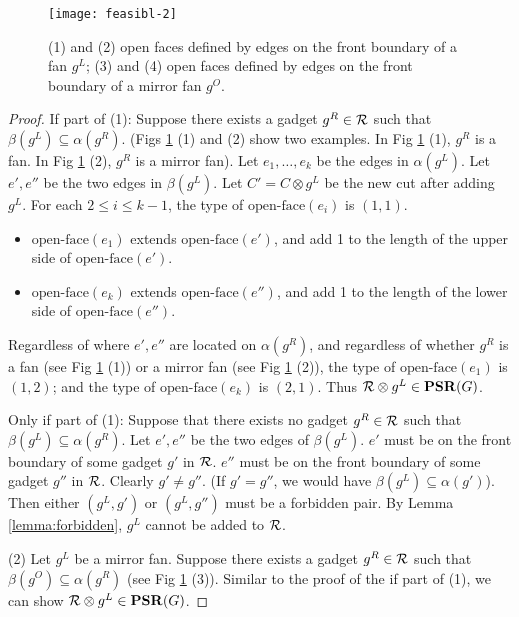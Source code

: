 \documentclass[11pt]{article}
\newcommand{\R}{{\cal R}}
\newcommand{\PSR}{\mathbf{PSR}}
\begin{document}
\begin{figure}[ht]
\begin{center}
\texttt{[image: feasibl-2]}
\centering
\caption{(1) and (2) open faces defined by edges on the front boundary of a fan $g^L$;
(3) and (4) open faces defined by edges on the front boundary of a mirror fan $g^O$.}
\label{fig:feasible}
\end{center}
\end{figure}
\vspace{-0.2in}

\begin{proof} If part of (1): Suppose there exists a gadget $g^R\in \R$
such that $\beta(g^L)\subseteq \alpha(g^R)$.
(Figs \ref{fig:feasible} (1) and (2) show two examples. In Fig
\ref{fig:feasible} (1), $g^R$ is a fan. In Fig \ref{fig:feasible} (2),
$g^R$ is a mirror fan). Let $e_1,\ldots,e_k$ be the edges in $\alpha(g^L)$.
Let $e',e''$ be the two edges in $\beta(g^L)$. Let $C'=C\otimes g^L$ be
the new cut after adding $g^L$. For each $2\leq i \leq k-1$, the type
of $\mbox{open-face}(e_i)$ is $(1,1)$.

\begin{itemize}
\item $\mbox{open-face}(e_1)$ extends $\mbox{open-face}(e')$, and
add 1 to the length of the upper side of $\mbox{open-face}(e')$.
\item $\mbox{open-face}(e_k)$ extends $\mbox{open-face}(e'')$, and
add 1 to the length of the lower side of $\mbox{open-face}(e'')$.
\end{itemize}

Regardless of where $e',e''$ are located on $\alpha(g^R)$, and regardless
of whether $g^R$ is a fan (see Fig \ref{fig:feasible} (1)) or a mirror fan
(see Fig \ref{fig:feasible} (2)), the type of $\mbox{open-face}(e_1)$
is $(1,2)$; and the type of $\mbox{open-face}(e_k)$ is $(2,1)$.
Thus $\R\otimes g^L \in \PSR(G)$.

Only if part of (1): Suppose that there exists no gadget $g^R\in \R$
such that $\beta(g^L)\subseteq \alpha(g^R)$. Let $e',e''$ be the two
edges of $\beta(g^L)$. $e'$ must be on the front boundary
of some gadget $g'$ in $\R$. $e''$ must be on the front boundary of some
gadget $g''$ in $\R$. Clearly $g' \neq g''$.
(If $g' = g''$, we would have $\beta(g^L)\subseteq \alpha(g')$).
Then either $(g^L,g')$ or $(g^L,g'')$ must be a forbidden pair.
By Lemma \ref{lemma:forbidden}, $g^L$ cannot be added to $\R$.

(2) Let $g^L$ be a mirror fan. Suppose there exists a gadget $g^R\in \R$
such that $\beta(g^O)\subseteq \alpha(g^R)$ (see Fig \ref{fig:feasible} (3)).
Similar to the proof of the if part of (1), we can show
$\R\otimes g^L \in \PSR(G)$.
\end{proof}
\end{document}
